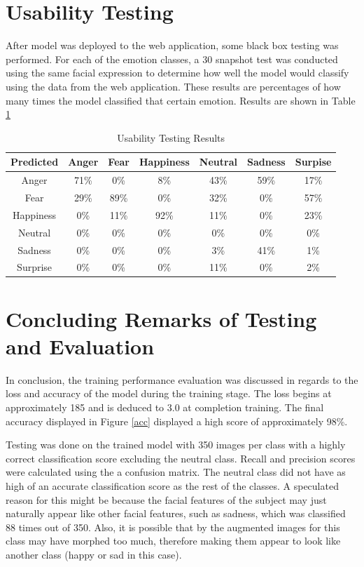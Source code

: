\section{Usability Testing}
After model was deployed to the web application, some black box testing was performed. For each of the emotion classes, a 30 snapshot test was conducted using the same facial expression to determine how well the model would classify using the data from the web application. These results are percentages of how many times the model classified that certain emotion. Results are shown in Table \ref{table:use}



\begin{table}[ht]
	\begin{center}
		\begin{tabular}{|c|c|c|c|c|c|c|}		
			\hline 
			Predicted & \textbf{Anger} &  \textbf{Fear} & \textbf{Happiness} & \textbf{Neutral} & \textbf{Sadness}& \textbf{Surpise}\\
			\hline 
			Anger & 71\% &0\% &8\% & 43\%& 59\% & 17\%\\
			\hline 
			Fear & 29\% & 89\% & 0\%& 32\%&0\% & 57\%\\
			\hline 
			Happiness &0\% &11\% &92\% & 11\%&0\% &23\% \\
			\hline 
			Neutral & 0\% &0\% &0\% & 0\%&0\% &0\% \\
			\hline 
			Sadness & 0\%&0\% &0\% & 3\%& 41\% &1\% \\
			\hline 
			Surprise & 0\%&0\% &0\% & 11\%&0\% & 2\%\\
			\hline
		\end{tabular}
		\caption{Usability Testing Results}
		\label{table:use}
	\end{center}
\end{table}
\newpage


\section{Concluding Remarks of Testing and Evaluation}
In conclusion, the training performance evaluation was discussed in regards to the loss and accuracy of the model during the training stage.
The loss begins at approximately 185 and is deduced to 3.0 at completion training. The final accuracy displayed in Figure \ref{acc} displayed a high score of approximately 98\%.

Testing was done on the trained model with 350 images per class with a highly correct classification score excluding the neutral class. Recall and precision scores were calculated using the a confusion matrix. The neutral class did not have as high of an accurate classification score as the rest of the classes. A speculated reason for this might be because the facial features of the subject may just naturally appear like other facial features, such as sadness, which was classified 88 times out of 350. Also, it is possible that by the augmented images for this class may have morphed too much, therefore making them appear to look like another class (happy or sad in this case).

